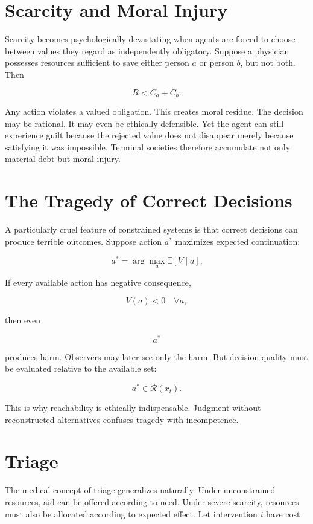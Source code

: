 \documentclass[11pt,oneside]{book}
\theoremstyle{definition}
\theoremstyle{remark}
\newcommand{\R}{\mathcal{R}}
\begin{document}
\section{Scarcity and Moral Injury}

Scarcity becomes psychologically devastating when agents are forced to choose between values they
regard as independently obligatory. Suppose a physician possesses resources sufficient to save
either person \(a\) or person \(b\), but not both. Then

\[
R< C_a+C_b.
\]

Any action violates a valued obligation. This creates moral residue. The decision may be rational.
It may even be ethically defensible. Yet the agent can still experience guilt because the rejected
value does not disappear merely because satisfying it was impossible. Terminal societies therefore
accumulate not only material debt but moral injury.

\section{The Tragedy of Correct Decisions}

A particularly cruel feature of constrained systems is that correct decisions can produce terrible
outcomes. Suppose action \(a^\ast\) maximizes expected continuation:

\[
a^\ast = \arg\max_a \mathbb E[V\mid a].
\]

If every available action has negative consequence,

\[
V(a)<0 \quad \forall a,
\]

then even

\[
a^\ast
\]

produces harm. Observers may later see only the harm. But decision quality must be evaluated
relative to the available set:

\[
a^\ast\in\R(x_t).
\]

This is why reachability is ethically indispensable. Judgment without reconstructed alternatives
confuses tragedy with incompetence.

\section{Triage}

The medical concept of triage generalizes naturally. Under unconstrained resources, aid can be
offered according to need. Under severe scarcity, resources must also be allocated according to
expected effect. Let intervention \(i\) have cost
\end{document}
